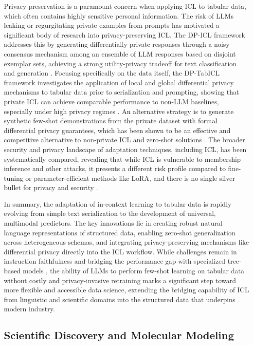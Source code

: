 \documentclass[11pt]{article}
\begin{document}
Privacy preservation is a paramount concern when applying ICL to tabular data, which often contains highly sensitive personal information. The risk of LLMs leaking or regurgitating private examples from prompts has motivated a significant body of research into privacy-preserving ICL. The DP-ICL framework addresses this by generating differentially private responses through a noisy consensus mechanism among an ensemble of LLM responses based on disjoint exemplar sets, achieving a strong utility-privacy tradeoff for text classification and generation \cite{ref454}. Focusing specifically on the data itself, the DP-TabICL framework investigates the application of local and global differential privacy mechanisms to tabular data prior to serialization and prompting, showing that private ICL can achieve comparable performance to non-LLM baselines, especially under high privacy regimes \cite{ref455}. An alternative strategy is to generate synthetic few-shot demonstrations from the private dataset with formal differential privacy guarantees, which has been shown to be an effective and competitive alternative to non-private ICL and zero-shot solutions \cite{ref476}. The broader security and privacy landscape of adaptation techniques, including ICL, has been systematically compared, revealing that while ICL is vulnerable to membership inference and other attacks, it presents a different risk profile compared to fine-tuning or parameter-efficient methods like LoRA, and there is no single silver bullet for privacy and security \cite{ref441}.

In summary, the adaptation of in-context learning to tabular data is rapidly evolving from simple text serialization to the development of universal, multimodal predictors. The key innovations lie in creating robust natural language representations of structured data, enabling zero-shot generalization across heterogeneous schemas, and integrating privacy-preserving mechanisms like differential privacy directly into the ICL workflow. While challenges remain in instruction faithfulness and bridging the performance gap with specialized tree-based models \cite{ref555}, the ability of LLMs to perform few-shot learning on tabular data without costly and privacy-invasive retraining marks a significant step toward more flexible and accessible data science, extending the bridging capability of ICL from linguistic and scientific domains into the structured data that underpins modern industry.

\subsection{Scientific Discovery and Molecular Modeling}
\end{document}
